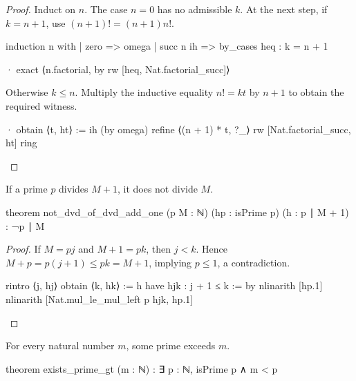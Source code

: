 \begin{proof}
  Induct on $n$.
  The case $n=0$ has no admissible $k$.
  At the next step, if $k=n+1$, use $(n+1)!
    =(n+1)n!$.

  \begin{lean}
    induction n with
    | zero => omega
    | succ n ih =>
      by_cases heq : k = n + 1

      · exact ⟨n.factorial, by rw [heq, Nat.factorial_succ]⟩
  \end{lean}

  Otherwise $k\le n$.
  Multiply the inductive equality $n!
    =kt$ by $n+1$ to obtain the required witness.

  \begin{lean}
    · obtain ⟨t, ht⟩ := ih (by omega)
      refine ⟨(n + 1) * t, ?_⟩
      rw [Nat.factorial_succ, ht]
      ring
  \end{lean}
\end{proof}

\begin{lemma}
  \label{ent:lem:prime-not-divide-consecutive}
  If a prime $p$ divides $M+1$, it does not divide $M$.

  \begin{lean}
    theorem not_dvd_of_dvd_add_one (p M : ℕ) (hp : isPrime p) (h : p ∣ M + 1) :
        ¬p ∣ M
  \end{lean}
\end{lemma}

\begin{proof}
  If $M=pj$ and $M+1=pk$, then $j<k$.
  Hence $M+p=p(j+1)\le pk=M+1$, implying $p\le1$, a contradiction.

  \begin{lean}
    rintro ⟨j, hj⟩
    obtain ⟨k, hk⟩ := h
    have hjk : j + 1 ≤ k := by
      nlinarith [hp.1]
    nlinarith [Nat.mul_le_mul_left p hjk, hp.1]
  \end{lean}

\end{proof}

\begin{lemma}
  \label{ent:lem:prime-above-bound}
  For every natural number $m$, some prime exceeds $m$.

  \begin{lean}
    theorem exists_prime_gt (m : ℕ) : ∃ p : ℕ, isPrime p ∧ m < p
  \end{lean}
\end{lemma}

